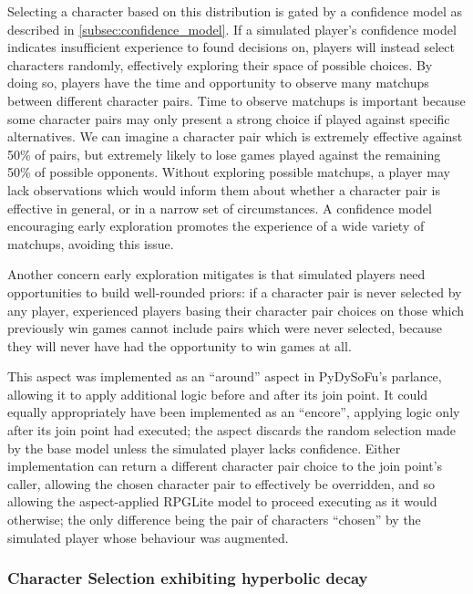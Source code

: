 Selecting a character based on this
distribution is gated by a confidence model as described in \cref{subsec:confidence_model}. If a
simulated player's confidence model indicates insufficient experience to found decisions on, players
will instead select characters randomly, effectively exploring their space of possible choices.
By doing so, players have the time and opportunity to observe many matchups between different character pairs.
Time to observe matchups is important because some character pairs may only present a strong choice
if played against specific alternatives.
We can imagine a character pair which is extremely effective against 50\% of pairs, but extremely likely
to lose games played against the remaining 50\% of possible opponents. Without exploring possible matchups,
a player may lack observations which would inform them about whether a character pair is effective in general, or
in a narrow set of circumstances. A confidence model encouraging early exploration promotes the experience
of a wide variety of matchups, avoiding this issue.

Another concern early exploration mitigates is that simulated players need opportunities to build
well-rounded priors: if a character pair is never selected by any player, experienced players basing their
character pair choices on those which previously win games cannot include pairs which were never selected,
because they will never have had the opportunity to win games at all.

This aspect was implemented as an ``around'' aspect in PyDySoFu's parlance, allowing it to
apply additional logic before and after its join point. It could equally appropriately have been
implemented as an ``encore'', applying logic only after its join point had executed; the aspect
discards the random selection made by the base model unless the simulated player lacks confidence.
Either implementation can return a different character pair choice to the join point's caller, allowing
the chosen character pair to effectively be overridden, and so allowing the aspect-applied RPGLite model to
proceed executing as it would otherwise; the only difference being the pair of characters ``chosen'' by the
simulated player whose behaviour was augmented.


\subsubsection{Character Selection exhibiting hyperbolic decay}\label{subsubsec:learning_with_hyperbolic_decay}

